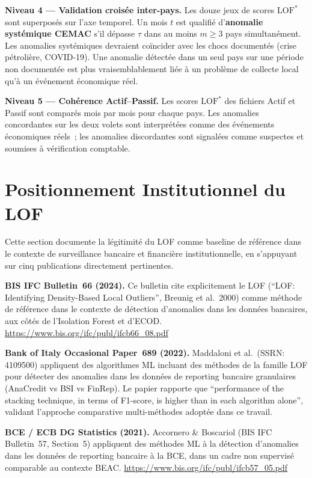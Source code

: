 \documentclass[12pt,a4paper]{article}
\begin{document}
\textbf{Niveau 4 --- Validation croisée inter-pays.}
Les douze jeux de scores $\mathrm{LOF}^*$ sont superposés sur l'axe temporel.
Un mois $t$ est qualifié d'\textbf{anomalie systémique CEMAC} s'il dépasse
$\tau$ dans au moins $m \geq 3$ pays simultanément. Les anomalies systémiques
devraient coïncider avec les chocs documentés (crise pétrolière, COVID-19).
Une anomalie détectée dans un seul pays sur une période non documentée est
plus vraisemblablement liée à un problème de collecte local qu'à un événement
économique réel.

\textbf{Niveau 5 --- Cohérence Actif--Passif.}
Les scores $\mathrm{LOF}^*$ des fichiers Actif et Passif sont comparés mois
par mois pour chaque pays. Les anomalies concordantes sur les deux volets
sont interprétées comme des événements économiques réels~; les anomalies
discordantes sont signalées comme suspectes et soumises à vérification
comptable.

\section{Positionnement Institutionnel du LOF}

Cette section documente la légitimité du LOF comme baseline de référence
dans le contexte de surveillance bancaire et financière institutionnelle,
en s'appuyant sur cinq publications directement pertinentes.

\textbf{BIS IFC Bulletin~66 (2024).} Ce bulletin cite explicitement le LOF
(``LOF: Identifying Density-Based Local Outliers'', Breunig et al.\ 2000)
comme méthode de référence dans le contexte de détection d'anomalies dans les
données bancaires, aux côtés de l'Isolation Forest et d'ECOD.
\url{https://www.bis.org/ifc/publ/ifcb66\_08.pdf}

\textbf{Bank of Italy Occasional Paper~689 (2022).} Maddaloni et al.\ (SSRN:
4109500) appliquent des algorithmes ML incluant des méthodes de la famille LOF
pour détecter des anomalies dans les données de reporting bancaire granulaires
(AnaCredit vs BSI vs FinRep). Le papier rapporte que ``performance of the
stacking technique, in terms of F1-score, is higher than in each algorithm
alone'', validant l'approche comparative multi-méthodes adoptée dans ce travail.

\textbf{BCE / ECB DG Statistics (2021).} Accornero \& Boscariol (BIS IFC
Bulletin~57, Section~5) appliquent des méthodes ML à la détection d'anomalies
dans les données de reporting bancaire à la BCE, dans un cadre non supervisé
comparable au contexte BEAC.
\url{https://www.bis.org/ifc/publ/ifcb57\_05.pdf}
\end{document}
